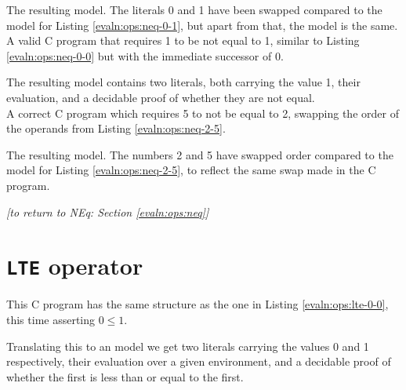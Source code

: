     The resulting \Idris model. The literals 0 and 1 have been swapped compared to the model for Listing \ref{evaln:ops:neq-0-1}, but apart from that, the model is the same.
    \\
    
    
    A valid C program that requires 1 to be not equal to 1, similar to Listing \ref{evaln:ops:neq-0-0} but with the immediate successor of 0.
    
    The resulting model contains two literals, both carrying the value 1, their evaluation, and a decidable proof of whether they are not equal.
    \\
    
    
    A correct C program which requires 5 to not be equal to 2, swapping the order of the operands from Listing \ref{evaln:ops:neq-2-5}.
    
    The resulting \Idris model. The numbers 2 and 5 have swapped order compared to the model for Listing \ref{evaln:ops:neq-2-5}, to reflect the same swap made in the C program.
    \\
    
    \begin{flushright}
        \textit{[to return to NEq: Section \ref{evaln:ops:neq}]}
    \end{flushright}

\newpage


\section{\texttt{LTE} operator}\label{app:evaln:ops:lte}
    
    
    This C program has the same structure as the one in Listing \ref{evaln:ops:lte-0-0}, this time asserting $0 \leq 1$.
    
    
    Translating this to an \Idris model we get two literals carrying the values 0 and 1 respectively, their evaluation over a given environment, and a decidable proof of whether the first is less than or equal to the first.

